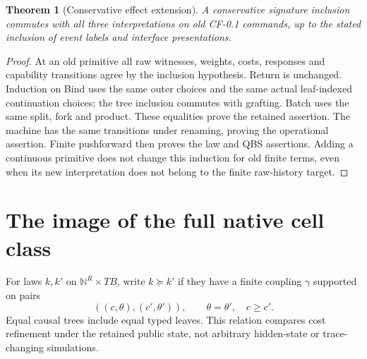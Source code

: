 \documentclass[11pt,a4paper]{article}
\newtheorem{theorem}{Theorem}[section]
\theoremstyle{definition}
\begin{document}
\begin{theorem}[Conservative effect extension]\label{thm:extension}
A conservative signature inclusion commutes with all three interpretations
on old CF-0.1 commands, up to the stated inclusion of event labels and
interface presentations.
\end{theorem}
\begin{proof}
At an old primitive all raw witnesses, weights, costs, responses and
capability transitions agree by the inclusion hypothesis. Return is
unchanged. Induction on Bind uses the same outer choices and the same
actual leaf-indexed continuation choices; the tree inclusion commutes with
grafting. Batch uses the same split, fork and product. These equalities
prove the retained assertion. The machine has the same transitions under
renaming, proving the operational assertion. Finite pushforward then proves
the law and QBS assertions. Adding a continuous primitive does not change
this induction for old finite terms, even when its new interpretation does
not belong to the finite raw-history target.
\end{proof}

\section{The image of the full native cell class}\label{sec:cells}
For laws $k,k'$ on $\mathbb N^R\times TB$, write $k\succeq k'$ if they
have a finite coupling $\gamma$ supported on pairs
\[
 ((c,\theta),(c',\theta')),
 \qquad\theta=\theta',\quad c\ge c'.
\]
Equal causal trees include equal typed leaves. This relation compares cost
refinement under the retained public state, not arbitrary hidden-state or
trace-changing simulations.
\end{document}

